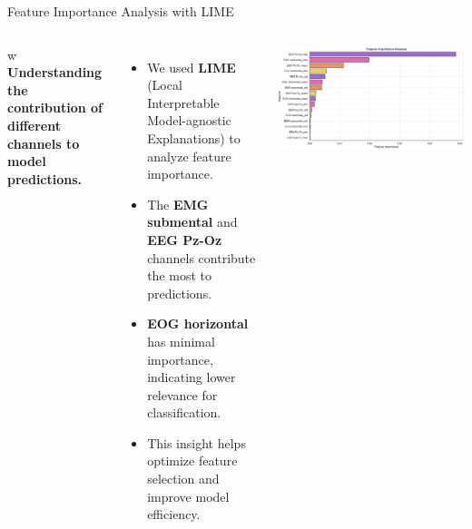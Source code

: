 \begin{frame}{Feature Importance Analysis with LIME}

    \begin{columns}

        w
        \textbf{Understanding the contribution of different channels to model predictions.}

        \begin{itemize}
            \item We used \textbf{LIME} (Local Interpretable Model-agnostic Explanations) to analyze feature importance.
            \item The \textbf{EMG submental} and \textbf{EEG Pz-Oz} channels contribute the most to predictions.
            \item \textbf{EOG horizontal} has minimal importance, indicating lower relevance for classification.
            \item This insight helps optimize feature selection and improve model efficiency.
        \end{itemize}

        \centering
        \includegraphics[width=0.9\linewidth]{figures/feature importance chanels analysis.png} %

    \end{columns}

\end{frame}



